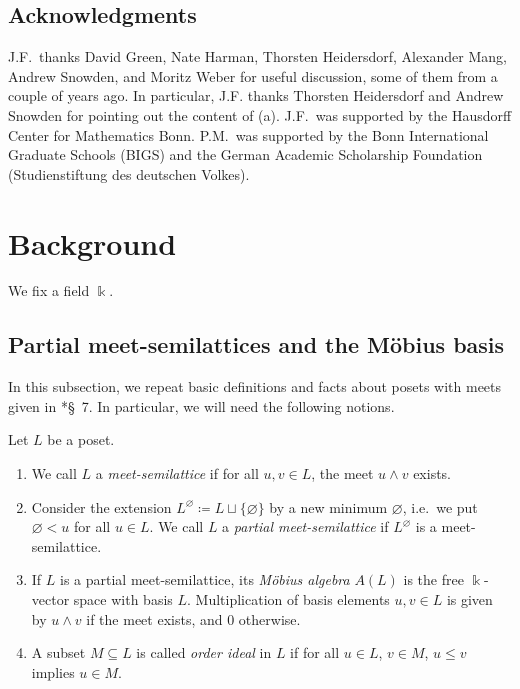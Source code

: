 \documentclass[11pt]{amsart}
\newcommand\Cref[1]{\zcref[S]{#1}}
\theoremstyle{definition}
\theoremstyle{remark}
\newcommand\kk{\Bbbk}
\renewcommand\:\colon
\renewcommand\:\colon
\begin{document}
\subsection*{Acknowledgments} J.F.~thanks David Green, Nate Harman, Thorsten Heidersdorf, Alexander Mang, Andrew Snowden, and Moritz Weber for useful discussion, some of them from a couple of years ago. In particular, J.F. thanks Thorsten Heidersdorf and Andrew Snowden for pointing out the content of \Cref{p:knoptooligo}(a). J.F.~was supported by the Hausdorff Center for Mathematics Bonn. P.M.~was supported by the Bonn International Graduate Schools (BIGS) and the German Academic Scholarship Foundation (Studienstiftung des deutschen Volkes). 


\tableofcontents

\section{Background}

We fix a field $\kk$.

\subsection{Partial meet-semilattices and the Möbius basis}

In this subsection, we repeat basic definitions and facts about posets with meets given in \cite{knop}*{\S~7}. In particular, we will need the following notions.

\begin{definition}
    Let $L$ be a poset.

    \begin{enumerate}
        \item[(a)] We call $L$ a \emph{meet-semilattice} if for all $u, v \in L$, the meet $u \wedge v$ exists.
        \item[(b)] Consider the extension $L^\varnothing \coloneqq L \sqcup \{\varnothing\}$ by a new minimum $\varnothing$, i.e.~we put $\varnothing < u$ for all $u \in L$. We call $L$ a \emph{partial meet-semilattice} if $L^\varnothing$ is a meet-semilattice.
        \item[(c)] If $L$ is a partial meet-semilattice, its \emph{Möbius algebra} $A(L)$ is the free $\kk$-vector space with basis $L$. Multiplication of basis elements $u, v \in L$ is given by $u \wedge v$ if the meet exists, and 0 otherwise.
        \item[(d)] A subset $M\subseteq L$ is called \emph{order ideal} in $L$ if for all $u\in L$, $v \in M$, $u \leq v$ implies $u \in M$.
    \end{enumerate}
\end{definition}
\end{document}
